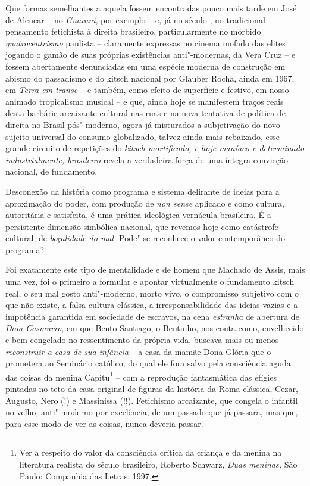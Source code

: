 Que formas semelhantes a aquela fossem encontradas pouco mais tarde em
José de Alencar -- no \emph{Guarani}, por exemplo -- e, já no século ,
no tradicional pensamento fetichista à direita brasileiro,
particularmente no mórbido \emph{quatrocentrismo} paulista -- claramente
expressas no cinema mofado das elites jogando o gamão de suas próprias
existências anti"-modernas, da Vera Cruz -- e fossem abertamente
denunciadas em uma espécie moderna de construção em abismo do passadismo
e do kitsch nacional por Glauber Rocha, ainda em 1967, em \emph{Terra em
transe --} e também, como efeito de superfície e festivo, em nosso
animado tropicalismo musical -- e que, ainda hoje se manifestem traços
reais desta barbárie arcaizante cultural nas ruas e na nova tentativa de
política de direita no Brasil pós"-moderno, agora já misturados a
subjetivação do novo sujeito universal do consumo globalizado, talvez
ainda mais rebaixado, esse grande circuito de repetições do \emph{kitsch
mortificado, e hoje maníaco e determinado industrialmente, brasileiro}
revela a verdadeira força de uma íntegra convicção nacional, de
fundamento.

Desconexão da história como programa e sistema delirante de ideias para
a aproximação do poder, com produção de \emph{non sense} aplicado e como
cultura, autoritária e satisfeita, é uma prática ideológica vernácula
brasileira. É a persistente dimensão simbólica nacional, que revemos
hoje como catástrofe cultural, de \emph{boçalidade do mal.} Pode"-se
reconhece o valor contemporâneo do programa?

Foi exatamente este tipo de mentalidade e de homem que Machado de Assis,
mais uma vez, foi o primeiro a formular e apontar virtualmente o
fundamento kitsch real, o seu mal gosto anti"-moderno, morto vivo, o
compromisso subjetivo com o que não existe, a falsa cultura clássica, a
irresponsabilidade das ideias vazias e a impotência garantida em
sociedade de escravos, na cena \emph{estranha} de abertura de \emph{Dom
Casmurro}, em que Bento Santiago, o Bentinho, nos conta como,
envelhecido e bem congelado no ressentimento da própria vida, buscava
mais ou menos \emph{reconstruir a casa de sua infância} -- a casa da
mamãe Dona Glória que o prometera ao Seminário católico, do qual ele
fora salvo pela consciência aguda das coisas da menina Capitu\footnote{Ver
  a respeito do valor da consciência crítica da criança e da menina na
  literatura realista do século  brasileiro, Roberto Schwarz,
  \emph{Duas meninas,} São Paulo: Companhia das Letras, 1997.} -- com a
reprodução fantasmática das efígies pintadas no teto da casa original de
figuras da história da Roma clássica, Cezar, Augusto, Nero (!) e
Massinissa (!!). Fetichismo arcaizante, que congela o infantil no velho,
anti"-moderno por excelência, de um passado que já passara, mas que, para
esse modo de ver as coisas, nunca deveria passar.

